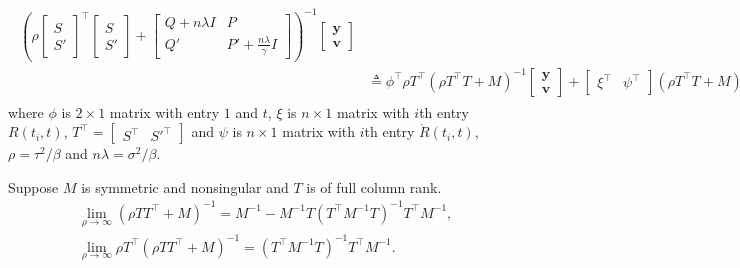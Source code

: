 \begin{align}
\begin{split}
\left(\rho\begin{bmatrix} S \\ S' \end{bmatrix}^\top \begin{bmatrix} S \\ S' \end{bmatrix}+
\begin{bmatrix} Q+n\lambda I& P\\
Q'& P'+\frac{n\lambda}{\gamma}I\end{bmatrix}\right) ^{-1}
\begin{bmatrix}\mathbf{y}\\ \mathbf{v} \end{bmatrix}\\
&\triangleq\phi^\top \rho T^\top \left(\rho T^\top T+M\right) ^{-1} \begin{bmatrix}\mathbf{y}\\ \mathbf{v} \end{bmatrix}
+ \begin{bmatrix} \xi^\top & \psi^\top\end{bmatrix}\left(\rho T^\top T+M\right) ^{-1} \begin{bmatrix}\mathbf{y}\\ \mathbf{v} \end{bmatrix}
\end{split}
\end{align}\normalsize
where $\phi$ is $2 \times 1$ matrix with entry $1$ and $t$, $\xi$ is $n\times 1$ matrix with $i$th entry $R(t_i,t)$, $T^\top =\begin{bmatrix} S^\top & S'^\top \end{bmatrix}$ and $\psi$ is $n\times 1$ matrix with $i$th entry  $\dot{R}(t_i,t)$, $\rho=\tau^2/\beta$ and $n\lambda =\sigma^2/\beta$. 

\begin{lemma}\label{GPLemma}
	Suppose $M$ is symmetric and nonsingular and $T$ is of full column rank. 
	\begin{align}
	&\lim\limits_{\rho \rightarrow \infty}\left(\rho TT^\top+M\right)^{-1}=M^{-1}-M^{-1}T\left(T^\top M^{-1}T\right)^{-1}T^\top M^{-1},\\
	&\lim\limits_{\rho \rightarrow \infty}\rho T^\top\left(\rho TT^\top+M\right)^{-1}=\left(T^\top M^{-1}T\right)^{-1}T^\top M^{-1}.
	\end{align}
\end{lemma}

